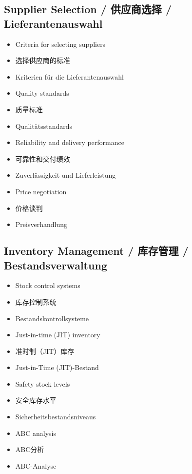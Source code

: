 \subsection{Supplier Selection / 供应商选择 / Lieferantenauswahl}
\begin{itemize}
    \item Criteria for selecting suppliers
    \item 选择供应商的标准
    \item Kriterien für die Lieferantenauswahl
    \item Quality standards
    \item 质量标准
    \item Qualitätsstandards
    \item Reliability and delivery performance
    \item 可靠性和交付绩效
    \item Zuverlässigkeit und Lieferleistung
    \item Price negotiation
    \item 价格谈判
    \item Preisverhandlung
\end{itemize}

\subsection{Inventory Management / 库存管理 / Bestandsverwaltung}
\begin{itemize}
    \item Stock control systems
    \item 库存控制系统
    \item Bestandskontrollsysteme
    \item Just-in-time (JIT) inventory
    \item 准时制（JIT）库存
    \item Just-in-Time (JIT)-Bestand
    \item Safety stock levels
    \item 安全库存水平
    \item Sicherheitsbestandsniveaus
    \item ABC analysis
    \item ABC分析
    \item ABC-Analyse
\end{itemize}

